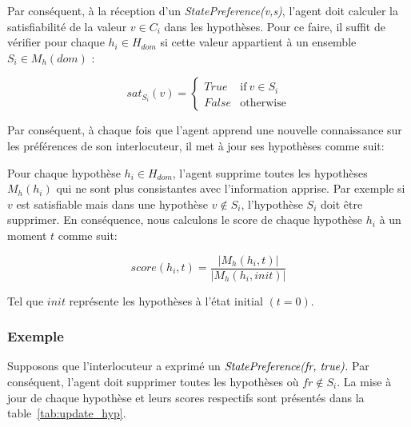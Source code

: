 Par conséquent, à la réception d'un \emph{StatePreference(v,s)}, l'agent doit calculer la satisfiabilité de la valeur  $v \in C_i$ dans les hypothèses. Pour ce faire, il suffit de vérifier pour chaque $h_i \in H_{dom}$ si cette valeur appartient à un ensemble $S_i \in M_h(dom)$ :

\begin{equation}
sat_{S_i}(v)= \left\{\begin{array}{ll}
True	 & \mathrm{if\ }  v \in S_i\\
False & \mathrm{otherwise}
\end{array}\right.
\end{equation}

Par conséquent, à chaque fois que l'agent apprend une nouvelle connaissance sur les préférences de son interlocuteur, il met à jour ses hypothèses  comme suit: 

Pour chaque hypothèse $h_i \in H_{dom}$, l'agent supprime toutes les hypothèses $M_h(h_i)$ qui ne sont plus consistantes avec l'information apprise. Par exemple si $v$ est satisfiable mais dans une hypothèse $v \not \in S_i$, l'hypothèse $S_i$ doit être supprimer.
En conséquence, nous calculons le score de chaque hypothèse $h_i$ à un moment $t$ comme suit: 

$$score(h_i,t) = \frac{|M_h(h_i, t)|}{|M_h(h_i, init)|}$$

Tel que $init$ représente les hypothèses à l'état initial $(t=0)$.

\subsubsection{Exemple}
Supposons que l'interlocuteur a exprimé un  $\emph{StatePreference(fr, true)}$. Par conséquent, l'agent doit supprimer toutes les hypothèses où $fr\not\in S_i$. La mise à jour de chaque hypothèse et leurs scores respectifs sont présentés dans la table~\ref{tab:update_hyp}. 

